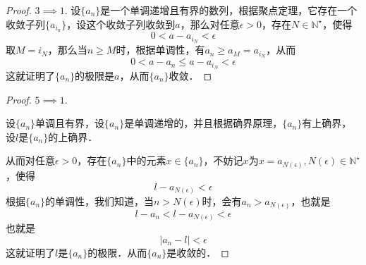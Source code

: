 \documentclass{ctexart}
\theoremstyle{definition}
\theoremstyle{definition}
\theoremstyle{plain}
\theoremstyle{plain}
\theoremstyle{plain}
\theoremstyle{definition}
\newcommand{\nat}{\mathbb{N}^\star}
\begin{document}
\begin{proof}
$3 \implies 1$.
设$\{ a_n \}$是一个单调递增且有界的数列，根据聚点定理，它存在一个收敛子列$\{ a_{i_n} \}$，设这个收敛子列收敛到$a$，那么对任意$\epsilon > 0$，存在$N \in \nat$，使得
\begin{equation}
    0 < a - a_{i_N} < \epsilon
\end{equation}
取$M = i_N$，那么当$n \geq M$时，根据单调性，有$a_n \geq a_M = a_{i_N}$，从而
\begin{equation}
    0 < a - a_{n} \leq a - a_{i_N} < \epsilon
\end{equation}
这就证明了$\{ a_n \}$的极限是$a$，从而$\{ a_n \}$收敛．
\end{proof}

\begin{proof}
$5 \implies 1$.

\noindent 设$\{a_n\}$单调且有界，设$\{a_n\}$是单调递增的，并且根据确界原理，$\{a_n\}$有上确界，设$l$是$\{a_n\}$的上确界．

\noindent 从而对任意$\epsilon > 0$，存在$\{a_n\}$中的元素$x \in \{a_n\}$，不妨记$x$为$x=a_{N(\epsilon)}, N(\epsilon) \in \nat$，使得
\begin{equation}
    l - a_{N(\epsilon)} < \epsilon
\end{equation}
根据$\{a_n\}$的单调性，我们知道，当$n > N(\epsilon)$时，会有$a_n > a_{N(\epsilon)}$，也就是
\begin{equation}
    l - a_n < l - a_{N(\epsilon)} < \epsilon
\end{equation}
也就是
\begin{equation}
    |a_n - l| < \epsilon
\end{equation}
这就证明了$l$是$\{a_n\}$的极限．从而$\{a_n\}$是收敛的．
\end{proof}
\end{document}
